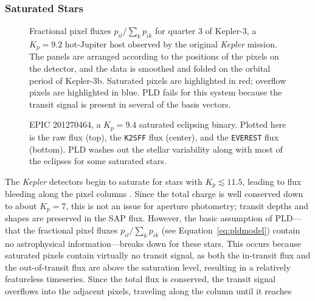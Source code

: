 \documentclass[]{emulateapj}
\begin{document}
\subsubsection{Saturated Stars}
\label{sec:saturated}
\begin{figure}[h]
  \begin{center}
       \caption{Fractional pixel fluxes $p_{il} / \sum_k{p_{ik}}$
                for quarter 3 of Kepler-3, a $K_p = 9.2$ hot-Jupiter host
                observed by the original \emph{Kepler} mission. The panels
                are arranged according to the positions of the pixels on
                the detector, and the data is smoothed and folded on the orbital period
                of Kepler-3b. Saturated pixels are highlighted in red;
                overflow pixels are highlighted in blue. PLD fails for this
                system because the transit signal is present in several of
                the basis vectors.}
     \label{fig:saturation}
  \end{center}
\end{figure}
\begin{figure}[h]
  \begin{center}
       \caption{EPIC 201270464, a $K_p = 9.4$ saturated eclipsing binary. Plotted here
                is the raw flux (top), the \texttt{K2SFF} flux (center), and the \texttt{EVEREST}
                flux (bottom). PLD washes out the stellar variability along with most of the eclipses
                for some saturated stars.}
     \label{fig:201270464}
  \end{center}
\end{figure}
The \emph{Kepler} detectors begin to saturate for stars with $K_p \lesssim 11.5$,
leading to flux bleeding along the pixel columns \citep{GIL10}. Since the total
charge is well conserved down to about $K_p = 7$, this is not an issue for
aperture photometry; transit depths and shapes are preserved in the SAP flux.
However, the basic assumption of PLD---that the fractional pixel fluxes 
$p_{il} / \sum_k{p_{ik}}$ (see Equation~\ref{eq:pldmodel}) contain no astrophysical 
information---breaks down for these stars. This occurs because saturated pixels 
contain virtually no transit signal, as both the in-transit flux and the out-of-transit
flux are above the saturation level, resulting in a relatively featureless
timeseries. Since the total flux is conserved, the transit signal 
overflows into the adjacent pixels, traveling along the column until it reaches
\end{document}

